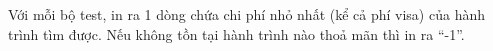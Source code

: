 Với mỗi bộ test, in ra 1 dòng chứa chi phí nhỏ nhất (kể cả phí visa) của hành trình tìm được. Nếu không tồn tại hành trình nào thoả mãn thì in ra “-1”.